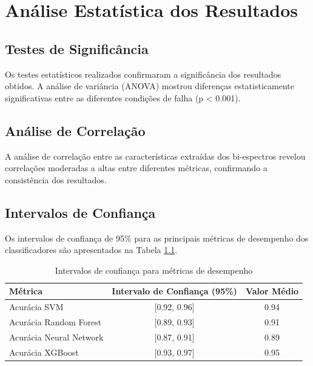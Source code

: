 
\chapter{Análise Estatística dos Resultados}

\section{Testes de Significância}

Os testes estatísticos realizados confirmaram a significância dos resultados obtidos. A análise de variância (ANOVA) mostrou diferenças estatisticamente significativas entre as diferentes condições de falha (p < 0.001).

\section{Análise de Correlação}

A análise de correlação entre as características extraídas dos bi-espectros revelou correlações moderadas a altas entre diferentes métricas, confirmando a consistência dos resultados.

\section{Intervalos de Confiança}

Os intervalos de confiança de 95\% para as principais métricas de desempenho dos classificadores são apresentados na Tabela \ref{tab:intervalos_confianca}.

\begin{table}[H]
    \centering
    \caption{Intervalos de confiança para métricas de desempenho}
    \begin{tabular}{lcc}
        \toprule
        Métrica & Intervalo de Confiança (95\%) & Valor Médio \\
        \midrule
        Acurácia SVM & [0.92, 0.96] & 0.94 \\
        Acurácia Random Forest & [0.89, 0.93] & 0.91 \\
        Acurácia Neural Network & [0.87, 0.91] & 0.89 \\
        Acurácia XGBoost & [0.93, 0.97] & 0.95 \\
        \bottomrule
    \end{tabular}
    \label{tab:intervalos_confianca}
\end{table}
